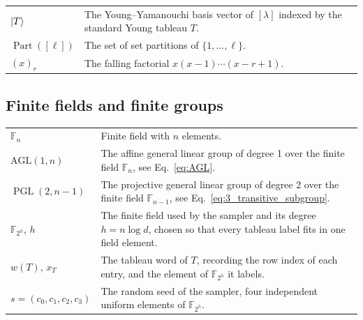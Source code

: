 \documentclass[10pt,twocolumn,superscriptaddress,aps,amsmath,amssymb,citeautoscript,floatfix,prx]{revtex4-2}
\theoremstyle{plain}
\theoremstyle{plain}
\theoremstyle{plain}
\theoremstyle{plain}
\theoremstyle{plain}
\theoremstyle{plain}
\theoremstyle{plain}
\theoremstyle{definition}
\theoremstyle{plain}
\begin{document}
\begin{appendix}
\begin{tabular}{@{}ll@{}}
\parbox[t]{0.22\textwidth}{$\ket T$} & \parbox[t]{0.72\textwidth}{The Young--Yamanouchi basis vector of $[\lambda]$ indexed by the standard Young tableau $T$.} \\[0.6em]

\parbox[t]{0.22\textwidth}{$\operatorname{Part}([\ell])$} & \parbox[t]{0.72\textwidth}{The set of set partitions of $\{1,\ldots,\ell\}$.} \\[0.6em]

\parbox[t]{0.22\textwidth}{$(x)_r$} & \parbox[t]{0.72\textwidth}{The falling factorial $x(x-1)\cdots(x-r+1)$.} \\[0.6em]

\end{tabular}


\subsection*{Finite fields and finite groups}

\begin{tabular}{@{}ll@{}}

\parbox[t]{0.22\textwidth}{$\mathbb{F}_n$} & \parbox[t]{0.72\textwidth}{Finite field with $n$ elements.} \\[0.6em]

\parbox[t]{0.22\textwidth}{$\mathrm{AGL}(1, n)$} & \parbox[t]{0.72\textwidth}{The affine general linear group of degree 1 over the finite field $\mathbb{F}_n$, see Eq.~\eqref{eq:AGL}.} \\[0.6em]

\parbox[t]{0.22\textwidth}{$\operatorname{PGL}(2, n-1)$} & \parbox[t]{0.72\textwidth}{The projective general linear group of degree 2 over the finite field $\mathbb{F}_{n-1}$, see Eq.~\eqref{eq:3_transitive_subgroup}.} \\[0.6em]

\parbox[t]{0.22\textwidth}{$\mathbb F_{2^h}$, $h$} & \parbox[t]{0.72\textwidth}{The finite field used by the sampler and its degree $h=n\log d$, chosen so that every tableau label fits in one field element.} \\[0.6em]

\parbox[t]{0.22\textwidth}{$w(T)$, $x_T$} & \parbox[t]{0.72\textwidth}{The tableau word of $T$, recording the row index of each entry, and the element of $\mathbb F_{2^h}$ it labels.} \\[0.6em]

\parbox[t]{0.22\textwidth}{$s=(c_0,c_1,c_2,c_3)$} & \parbox[t]{0.72\textwidth}{The random seed of the sampler, four independent uniform elements of $\mathbb F_{2^h}$.} \\[0.6em]


\end{tabular}
\end{appendix}
\end{document}
